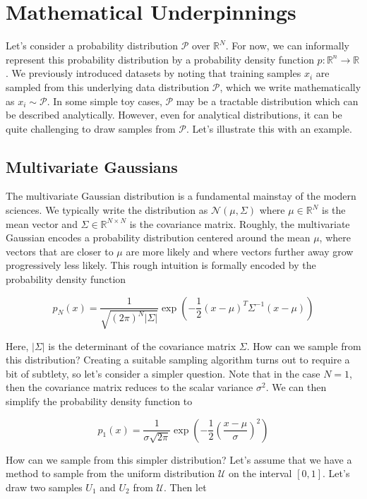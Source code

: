 \documentclass[book.tex]{subfiles}
\begin{document}
\section{Mathematical Underpinnings}

Let's consider a probability distribution $\mathcal{P}$ over $\mathbb{R}^N$. For now, we can informally represent this probability distribution by a probability density function $p: \mathbb{R}^n \to \mathbb{R}$. We previously introduced datasets by noting that training samples $x_i$ are sampled from this underlying data distribution  $\mathcal{P}$, which we write mathematically as $x_i \sim \mathcal{P}$. In some simple toy cases, $\mathcal{P}$ may be a tractable distribution which can be described analytically. However, even for analytical distributions, it can be quite challenging to draw samples from $\mathcal{P}$. Let's illustrate this with an example.

\subsection{Multivariate Gaussians}
The multivariate Gaussian distribution is a fundamental mainstay of the modern sciences. We typically write the distribution as $\mathcal{N}(\mu, \Sigma)$  where $\mu \in \mathbb{R}^N$ is the mean vector and $\Sigma \in \mathbb{R}^{N \times N}$ is the covariance matrix. Roughly, the multivariate Gaussian encodes a probability distribution centered around the mean $\mu$, where vectors that are closer to $\mu$ are more likely and where vectors further away grow progressively less likely. This rough intuition is formally encoded by the probability density function

\[ p_N(x) = \frac{1}{\sqrt{(2\pi)^N |\Sigma|}} \exp\left (-\frac{1}{2} (x - \mu)^T\Sigma^{-1}(x-\mu)\right ) \]

Here, $|\Sigma|$ is the determinant of the covariance matrix $\Sigma$. How can we sample from this  distribution? Creating a suitable sampling algorithm turns out to require a bit of subtlety, so let's consider a simpler question. Note that in the case $N = 1$, then the covariance matrix reduces to the scalar variance $\sigma^2$. We can then simplify the probability density function to

\[ p_1(x) = \frac{1}{\sigma\sqrt{2 \pi}} \exp \left ( -\frac{1}{2} \left ( \frac{x-\mu}{\sigma} \right )^2 \right ) \]

How can we sample from this simpler distribution? Let's assume that we have a method to sample from the uniform distribution $\mathcal{U}$ on the interval $[0, 1]$. Let's draw two samples $U_1$ and $U_2$ from $\mathcal{U}$. Then let 
\end{document}
